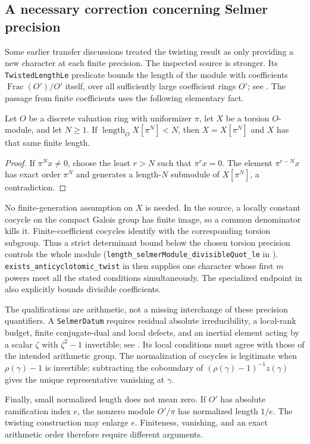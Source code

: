 \subsection{A necessary correction concerning Selmer precision}

Some earlier transfer discussions treated the twisting result as only
providing a new character at each finite precision. The inspected source
is stronger. Its \texttt{TwistedLengthLe} predicate bounds the length of
the module with coefficients $\operatorname{Frac}(O')/O'$ itself, over
all sufficiently large coefficient rings $O'$;
see .
The passage from finite coefficients uses the following elementary fact.

\begin{lemma}
Let $O$ be a discrete valuation ring with uniformizer $\pi$, let $X$ be
a torsion $O$-module, and let $N\ge1$. If
$\operatorname{length}_O X[\pi^N]<N$, then
$X=X[\pi^N]$ and $X$ has that same finite length.
\end{lemma}
\begin{proof}
If $\pi^Nx\ne0$, choose the least $r>N$ such that $\pi^rx=0$.
The element $\pi^{r-N}x$ has exact order $\pi^N$ and generates a
length-$N$ submodule of $X[\pi^N]$, a contradiction.
\end{proof}

No finite-generation assumption on $X$ is needed. In the source, a locally
constant cocycle on the compact Galois group has finite image, so a common
denominator kills it. Finite-coefficient cocycles identify with the
corresponding torsion subgroup. Thus a strict determinant bound below the
chosen torsion precision controls the whole module
(\texttt{length\_selmerModule\_divisibleQuot\_le} in
).
\texttt{exists\_anticyclotomic\_twist} in
then supplies one character whose first $m$ powers meet all the stated
conditions simultaneously. The specialized endpoint in
also explicitly bounds divisible coefficients.

The qualifications are arithmetic, not a missing interchange of these
precision quantifiers. A \texttt{SelmerDatum} requires residual absolute
irreducibility, a local-rank budget, finite conjugate-dual and local
defects, and an inertial element acting by a scalar $\zeta$ with
$\zeta^2-1$ invertible; see
.
Its local conditions must agree with those of the intended arithmetic
group. The normalization of cocycles is legitimate when
$\rho(\gamma)-1$ is invertible: subtracting the coboundary of
$(\rho(\gamma)-1)^{-1}z(\gamma)$ gives the unique representative vanishing
at $\gamma$.

Finally, small normalized length does not mean zero. If $O'$ has absolute
ramification index $e$, the nonzero module $O'/\pi$ has normalized length
$1/e$. The twisting construction may enlarge $e$. Finiteness, vanishing,
and an exact arithmetic order therefore require different arguments.
